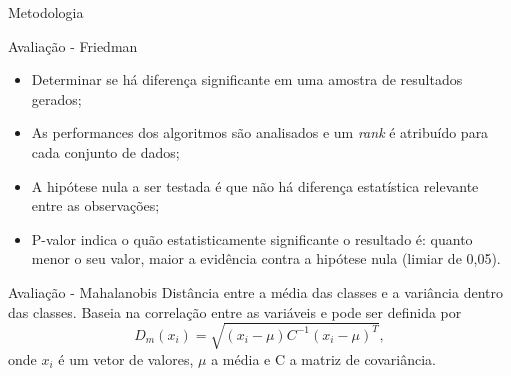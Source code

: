 \documentclass{beamer}
\begin{document}
\begin{frame}{Metodologia}
\begin{block}{Avaliação - Friedman}
\begin{itemize}
\item Determinar se há diferença significante em uma amostra de resultados gerados;
\item As performances dos algoritmos são analisados e um \textit{rank} é atribuído para cada conjunto de dados;
\item A hipótese nula a ser testada é que não há diferença estatística relevante entre as observações;
\item P-valor indica o quão estatisticamente significante o resultado é: quanto menor o seu valor, maior a evidência contra a hipótese nula (limiar de 0,05).
\end{itemize}
\end{block}
\end{frame}
\begin{frame}{}
\begin{block}{Avaliação - Mahalanobis}  %
Distância entre a média das classes e a variância dentro das classes. Baseia na correlação entre as variáveis e pode ser definida por
\begin{equation*}
  D_m(x_i) = \sqrt{(x_i - \mu)C^{-1}(x_i-\mu)^T},
\end{equation*}
\noindent onde $x_i$ é um vetor de valores, $\mu$ a média e C a matriz de covariância.
\end{block}
\end{frame}
\end{document}
